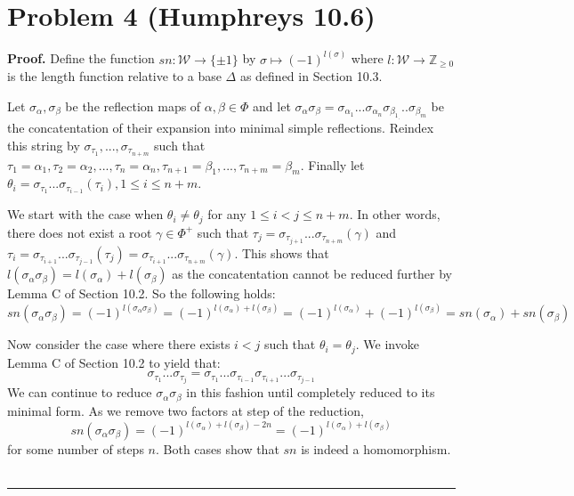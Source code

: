 \documentclass[12pt]{article}%
\newenvironment{proof}[1][Proof]{\textbf{#1.} }{\ \rule{0.5em}{0.5em}}
\begin{document}
\section*{Problem 4 (Humphreys 10.6)}
\begin{proof}
Define the function $sn: \mathcal{W} \rightarrow \{\pm 1\}$ by $\sigma \mapsto (-1)^{l(\sigma)}$ where $l:\mathcal{W} \rightarrow \mathbb{Z}_{\geq 0}$ is
the length function relative to a base $\Delta$ as defined in Section 10.3. \newline

Let $\sigma_{\alpha},\sigma_{\beta}$ be the reflection maps of $\alpha,\beta \in \Phi$ and let $\sigma_{\alpha}\sigma_{\beta} = \sigma_{\alpha_1} ... \sigma_{\alpha_n}\sigma_{\beta_1}_... \sigma_{\beta_m}$ be the concatentation of their expansion into minimal simple reflections. Reindex this string by $\sigma_{\tau_1},...,\sigma_{\tau_{n+m}}$ such that $\tau_1 = \alpha_{1},\tau_2 = \alpha_2,...,\tau_n = \alpha_n, \tau_{n+1} = \beta_1,...,\tau_{n+m} = \beta_m$. Finally let $\theta_i = \sigma_{\tau_{1}}...\sigma_{\tau_{i-1}}(\tau_{i}), 1 \leq i \leq n+m$. \newline

We start with the case when $\theta_i \neq \theta_j$ for any $1\leq i < j \leq n+m$. In other words,
there does not exist a root $\gamma \in \Phi^+$ such that $\tau_j = \sigma_{\tau_{j+1}}...\sigma_{\tau_{n+m}}(\gamma)$ and $\tau_i = \sigma_{\tau_{i+1}}... \sigma_{\tau_{j-1}}(\tau_j) = \sigma_{\tau_{i+1}}...
\sigma_{\tau_{n+m}}(\gamma)$. This shows that $l(\sigma_{\alpha}\sigma_{\beta}) = l(\sigma_{\alpha}) + l(\sigma_{\beta})$ as the concatentation cannot be reduced further by Lemma C of Section 10.2. So the following holds:
 $$sn(\sigma_{\alpha}\sigma_{\beta}) = (-1)^{l(\sigma_{\alpha}\sigma_{\beta})} = (-1)^{l(\sigma_{\alpha}) + l(\sigma_{\beta})} = (-1)^{l(\sigma_{\alpha})} + (-1)^{l(\sigma_{\beta})} = sn(\sigma_{\alpha}) + sn(\sigma_{\beta})$$

Now consider the case where there exists $i < j$ such that $\theta_i = \theta_j$. We invoke Lemma C of Section 10.2 to yield that:
$$ \sigma_{\tau_1}...\sigma_{\tau_j} =  \sigma_{\tau_1}... \sigma_{\tau_{i-1}}\sigma_{\tau_{i+1}}... \sigma_{\tau_{j-1}} $$
We can continue to reduce $\sigma_{\alpha}\sigma_{\beta}$ in this fashion until completely reduced to its minimal form. As we remove two factors at step of the reduction,
$$ sn(\sigma_{\alpha}\sigma_{\beta}) = (-1)^{l(\sigma_{\alpha}) + l(\sigma_{\beta}) - 2n} = (-1)^{l(\sigma_{\alpha}) + l(\sigma_{\beta})} $$ for some number of steps $n$. Both cases show that $sn$ is indeed a homomorphism.
\end{proof}
\end{document}
